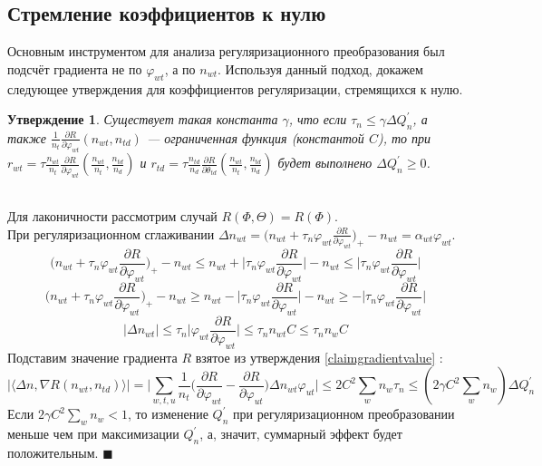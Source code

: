 \documentclass[12pt]{article}
\newtheorem{claim}[remark]{Утверждение}
\newenvironment{Proof} 
	{\par\noindent{\bf Доказательство.}} 
	{\hfill$\blacksquare$}
\renewcommand{\leq}{\leqslant}
\renewcommand{\geq}{\geqslant}
\renewcommand{\phi}{\varphi}
\begin{document}
           \subsection{Стремление коэффициентов к нулю}
Основным инструментом для анализа регуляризационного преобразования был подсчёт градиента не по $\phi_{wt}$, а по $n_{wt}$. Используя данный подход, докажем следующее утверждения для коэффициентов регуляризации, стремящихся к нулю.
\begin{claim}
Существует такая константа $\gamma$, что если $\tau_n \leq \gamma \Delta Q^{\prime}_n$, а также $\frac{1}{n_t} \frac{\partial{R}}{\partial{\phi_{wt}}}(n_{wt}, n_{td})$ --- ограниченная функция (константой $C$), то при $r_{wt} = \tau \frac{n_{wt}}{n_t} \frac{\partial{R}}{\partial{\phi_{wt}}} \left(\frac{n_{wt}}{n_t}, \frac{n_{td}}{n_d}\right)$ и $r_{td}= \tau \frac{n_{td}}{n_d} \frac{\partial{R}}{\partial{\theta_{td}}} \left(\frac{n_{wt}}{n_t}, \frac{n_{td}}{n_d}\right)$ будет выполнено $\Delta Q^{\prime}_n \geq 0$.
\end{claim}
\begin{Proof}
\ \\
Для лаконичности рассмотрим случай $R(\Phi, \Theta) = R(\Phi)$. \\
При регуляризационном сглаживании  $\Delta n_{wt} = \bigg( n_{wt} + \tau_n \phi_{wt} \frac{\partial{R}}{\partial{\phi_{wt}}}\bigg)_{+} - n_{wt} = \alpha_{wt} \phi_{wt}$.\\
\[
\bigg( n_{wt} + \tau_n \phi_{wt} \frac{\partial{R}}{\partial{\phi_{wt}}}\bigg)_{+} - n_{wt} \leq  n_{wt} +\bigg| \tau_n \phi_{wt} \frac{\partial{R}}{\partial{\phi_{wt}}}\bigg| - n_{wt} \leq \bigg| \tau_n \phi_{wt} \frac{\partial{R}}{\partial{\phi_{wt}}}\bigg|
\]
\[
\bigg( n_{wt} + \tau_n \phi_{wt} \frac{\partial{R}}{\partial{\phi_{wt}}}\bigg)_{+} - n_{wt} \geq  n_{wt} - \bigg| \tau_n \phi_{wt} \frac{\partial{R}}{\partial{\phi_{wt}}}\bigg| - n_{wt} \geq - \bigg| \tau_n \phi_{wt} \frac{\partial{R}}{\partial{\phi_{wt}}}\bigg|
\]
\[
|\Delta n_{wt} | \leq \tau_n\bigg|  \phi_{wt} \frac{\partial{R}}{\partial{\phi_{wt}}}\bigg| \leq \tau_n n_{wt} C \leq \tau_n n_{w} C
\]
Подставим значение градиента $R$ взятое из утверждения \ref{claimgradientvalue} :
\[
 \bigg|\langle\Delta n, \nabla R(n_{wt}, n_{td}) \rangle\bigg| = \bigg| \sum\limits_{w, t, u}  \frac{1}{n_{t}}  \bigg(  \frac{\partial{R}}{\partial{\phi_{wt}}}  -  \frac{\partial{R}}{\partial{\phi_{ut}}}  \bigg)  \Delta n_{wt}  \phi_{ut} \bigg| \leq 2C^2\sum_w n_w  \tau_n \leq (2 \gamma C^2\sum_w n_w) \Delta Q^{\prime}_n
\]
Если $ 2 \gamma C^2 \sum_w n_w < 1$, то изменение $Q^{\prime}_n$ при регуляризационном преобразовании меньше чем при максимизации $Q^{\prime}_n$, а, значит, суммарный эффект будет положительным.
\end{Proof}
\end{document}
